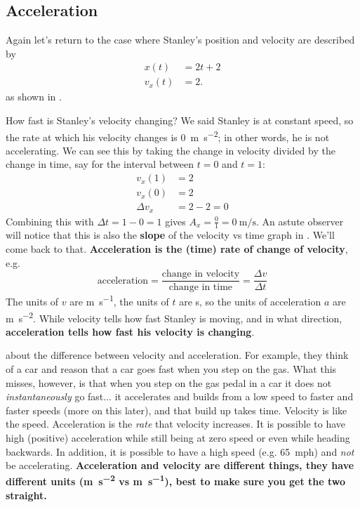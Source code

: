 \documentclass{tufte-handout}
\begin{document}
\subsection{Acceleration}
Again let's return to the case where Stanley's position and velocity are described by
\begin{align}
x(t) &= 2 t + 2 \\
v_x(t) &= 2. 
\end{align}
as shown in .
\begin{marginfigure}
\caption{Stanley's position, velocity, and acceleration}
\label{fig:acceleration1}
\end{marginfigure}
How fast is Stanley's velocity changing? We said Stanley is at constant speed, so the rate at which his velocity changes is \SI{0}{\meter\per\second\squared}; in other words, he is not accelerating. We can see this by taking the change in velocity divided by the change in time, say for the interval between $t=0$ and $t=1$:
\begin{align}
v_x(1) &= 2 \\
v_x(0) &= 2 \\
\Delta v_x &= 2 - 2 = 0
\end{align}
Combining this with $\Delta t = 1-0 = 1$ gives $A_x=\frac{0}{1}=\SI{0}{\meter\per\second}$. An astute observer will notice that this is also the \textbf{slope} of the velocity vs time graph in . We'll come back to that.  \textbf{Acceleration is the (time) rate of change of velocity}, e.g.
\begin{equation}
\text{acceleration} = \dfrac{\text{change in velocity}}{\text{change in time}} = \dfrac{\Delta v}{\Delta t}
\end{equation}
The units of $v$ are \si{\meter\per\second}, the units of $t$ are \si{\second}, so the units of acceleration $a$ are \si{\meter\per\second\squared}. While velocity tells how fast Stanley is moving, and in what direction, \textbf{acceleration tells how fast his velocity is changing}. 

 about the difference between velocity and acceleration. For example, they think of a car and reason that a car goes fast when you step on the gas. What this misses, however, is that when you step on the gas pedal in a car it does not \emph{instantaneously} go fast... it accelerates and builds from a low speed to faster and faster speeds (more on this later), and that build up takes time. Velocity is like the speed. Acceleration is the \emph{rate} that velocity increases. It is possible to have high (positive) acceleration while still being at zero speed or even while heading backwards. In addition, it is possible to have a high speed (e.g. \SI{65}{mph}) and \emph{not} be accelerating. \textbf{Acceleration and velocity are different things, they have different units (\si{\meter\per\second\squared} vs \si{\meter\per\second}), best to make sure you get the two straight.} 
\end{document}
